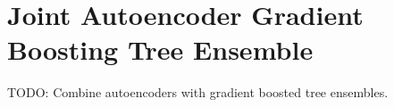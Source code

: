 \documentclass[\main/thesis.tex]{subfiles}
\begin{document}
\chapter{Joint Autoencoder Gradient Boosting Tree Ensemble}
\label{chp:aencxgb}

TODO: Combine autoencoders with gradient boosted tree ensembles.
\end{document}

